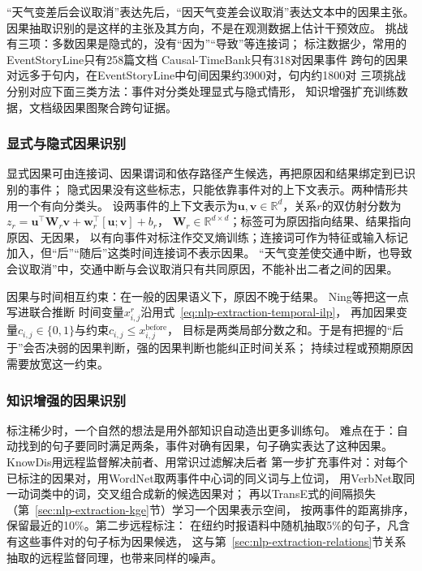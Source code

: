 “天气变差后会议取消”表达先后，“因天气变差会议取消”表达文本中的因果主张。
因果抽取识别的是这样的主张及其方向，不是在观测数据上估计干预效应。
挑战有三项：多数因果是隐式的，没有“因为”“导致”等连接词；
标注数据少，常用的EventStoryLine只有258篇文档
Causal-TimeBank只有318对因果事件
跨句的因果对远多于句内，在EventStoryLine中句间因果约3900对，句内约1800对
三项挑战分别对应下面三类方法：事件对分类处理显式与隐式情形，
知识增强扩充训练数据，文档级因果图聚合跨句证据。

\subsubsection{显式与隐式因果识别}
\label{sec:nlp-extraction-causal-explicit}

显式因果可由连接词、因果谓词和依存路径产生候选，再把原因和结果绑定到已识别的事件；
隐式因果没有这些标志，只能依靠事件对的上下文表示。两种情形共用一个有向分类头。
设两事件的上下文表示为$\bm{u},\bm{v}\in\mathbb{R}^{d}$，关系$r$的双仿射分数为
$z_r=\bm{u}^{\top}\bm{W}_r\bm{v}+\bm{w}_r^{\top}[\bm{u};\bm{v}]+b_r$，
$\bm{W}_r\in\mathbb{R}^{d\times d}$；标签可为原因指向结果、结果指向原因、无因果，
以有向事件对标注作交叉熵训练；连接词可作为特征或输入标记加入，但“后”“随后”这类时间连接词不表示因果。
“天气变差使交通中断，也导致会议取消”中，交通中断与会议取消只有共同原因，不能补出二者之间的因果。

因果与时间相互约束：在一般的因果语义下，原因不晚于结果。
Ning等把这一点写进联合推断
时间变量$x^{r}_{i,j}$沿用式~\eqref{eq:nlp-extraction-temporal-ilp}，
再加因果变量$c_{i,j}\in\{0,1\}$与约束$c_{i,j}\leq x^{\mathrm{before}}_{i,j}$，
目标是两类局部分数之和。于是有把握的“后于”会否决弱的因果判断，强的因果判断也能纠正时间关系；
持续过程或预期原因需要放宽这一约束。

\subsubsection{知识增强的因果识别}
\label{sec:nlp-extraction-causal-knowledge}

标注稀少时，一个自然的想法是用外部知识自动造出更多训练句。
难点在于：自动找到的句子要同时满足两条，事件对确有因果，句子确实表达了这种因果。
KnowDis用远程监督解决前者、用常识过滤解决后者
第一步扩充事件对：对每个已标注的因果对，用WordNet取两事件中心词的同义词与上位词，
用VerbNet取同一动词类中的词，交叉组合成新的候选因果对；
再以TransE式的间隔损失（第~\ref{sec:nlp-extraction-kge}节）学习一个因果表示空间，
按两事件的距离排序，保留最近的10\%。第二步远程标注：
在纽约时报语料中随机抽取5\%的句子，凡含有这些事件对的句子标为因果候选，
这与第~\ref{sec:nlp-extraction-relations}节关系抽取的远程监督同理，也带来同样的噪声。

